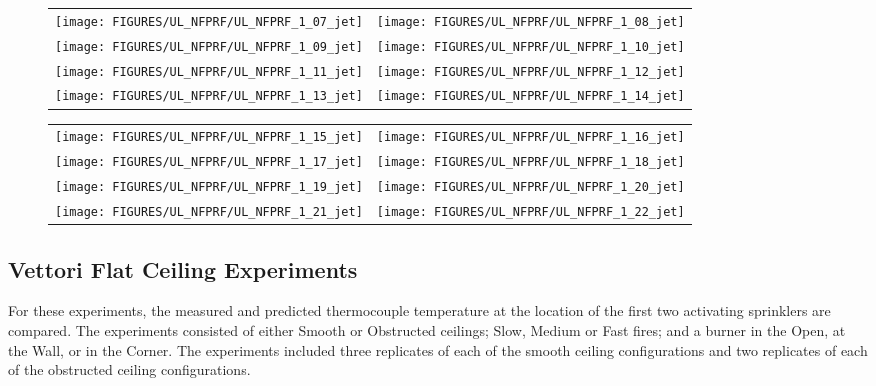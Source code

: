\begin{figure}[p]
\begin{tabular*}{\textwidth}{l@{\extracolsep{\fill}}r}
\texttt{[image: FIGURES/UL\_NFPRF/UL\_NFPRF\_1\_07\_jet]} &
\texttt{[image: FIGURES/UL\_NFPRF/UL\_NFPRF\_1\_08\_jet]} \\
\texttt{[image: FIGURES/UL\_NFPRF/UL\_NFPRF\_1\_09\_jet]} &
\texttt{[image: FIGURES/UL\_NFPRF/UL\_NFPRF\_1\_10\_jet]} \\
\texttt{[image: FIGURES/UL\_NFPRF/UL\_NFPRF\_1\_11\_jet]} &
\texttt{[image: FIGURES/UL\_NFPRF/UL\_NFPRF\_1\_12\_jet]} \\
\texttt{[image: FIGURES/UL\_NFPRF/UL\_NFPRF\_1\_13\_jet]} &
\texttt{[image: FIGURES/UL\_NFPRF/UL\_NFPRF\_1\_14\_jet]} 
\end{tabular*}
\label{UL_NFPRF_jet_2}
\end{figure}

\begin{figure}[p]
\begin{tabular*}{\textwidth}{l@{\extracolsep{\fill}}r}
\texttt{[image: FIGURES/UL\_NFPRF/UL\_NFPRF\_1\_15\_jet]} &
\texttt{[image: FIGURES/UL\_NFPRF/UL\_NFPRF\_1\_16\_jet]} \\
\texttt{[image: FIGURES/UL\_NFPRF/UL\_NFPRF\_1\_17\_jet]} &
\texttt{[image: FIGURES/UL\_NFPRF/UL\_NFPRF\_1\_18\_jet]} \\
\texttt{[image: FIGURES/UL\_NFPRF/UL\_NFPRF\_1\_19\_jet]} &
\texttt{[image: FIGURES/UL\_NFPRF/UL\_NFPRF\_1\_20\_jet]} \\
\texttt{[image: FIGURES/UL\_NFPRF/UL\_NFPRF\_1\_21\_jet]} &
\texttt{[image: FIGURES/UL\_NFPRF/UL\_NFPRF\_1\_22\_jet]} 
\end{tabular*}
\label{UL_NFPRF_jet_3}
\end{figure}


\clearpage

\subsection{Vettori Flat Ceiling Experiments}
\label{Vettori_Flat_Results}

For these experiments, the measured and predicted thermocouple temperature at the location of the first two activating sprinklers are compared. The experiments consisted of either Smooth or Obstructed ceilings; Slow, Medium or Fast fires; and a burner in the Open, at the Wall, or in the Corner.
The experiments included three replicates of each of the smooth ceiling configurations and two replicates of each of the obstructed ceiling configurations.


